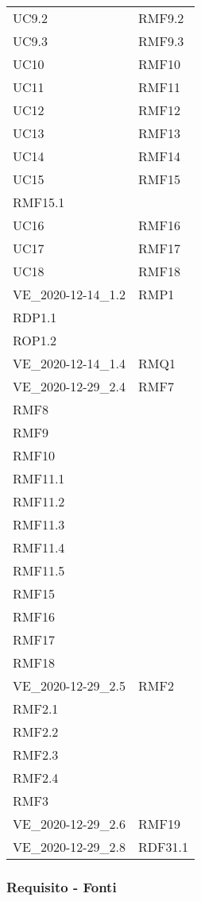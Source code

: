 \begin{longtable}[h!] { >{\centering}m{5cm} >{\centering}m{5cm} }
	 \tabularnewline
	 UC9.2 & RMF9.2
	 \tabularnewline
	 UC9.3 & RMF9.3
	 \tabularnewline
	 UC10 & RMF10
	 \tabularnewline
	 UC11 & RMF11
	 \tabularnewline
	 UC12 & RMF12
	 \tabularnewline
	 UC13 & RMF13
	 \tabularnewline
	 UC14 & RMF14
	 \tabularnewline
	 UC15 & RMF15 \\
	 RMF15.1
	 \tabularnewline
	 UC16 & RMF16
	 \tabularnewline
	 UC17 & RMF17
	 \tabularnewline
	 UC18 & RMF18
	 \tabularnewline
	 VE\_2020-12-14\_1.2 & RMP1 \\
	 RDP1.1 \\
	 ROP1.2
	 \tabularnewline
	 VE\_2020-12-14\_1.4 & RMQ1
	 \tabularnewline
	 VE\_2020-12-29\_2.4 & RMF7\\
	 RMF8 \\
	 RMF9 \\
	 RMF10 \\
	 RMF11.1 \\
	 RMF11.2 \\
	 RMF11.3 \\
	 RMF11.4 \\
	 RMF11.5 \\
	 RMF15 \\
	 RMF16 \\
	 RMF17 \\
	 RMF18
	 \tabularnewline
	 VE\_2020-12-29\_2.5 & RMF2 \\
	 RMF2.1 \\
	 RMF2.2 \\
	 RMF2.3 \\
	 RMF2.4 \\
	 RMF3
	 \tabularnewline
	 VE\_2020-12-29\_2.6 & RMF19
	 \tabularnewline
	 VE\_2020-12-29\_2.8 & RDF31.1
	 \tabularnewline

\end{longtable}

\newpage

\subsubsection{Requisito - Fonti}

